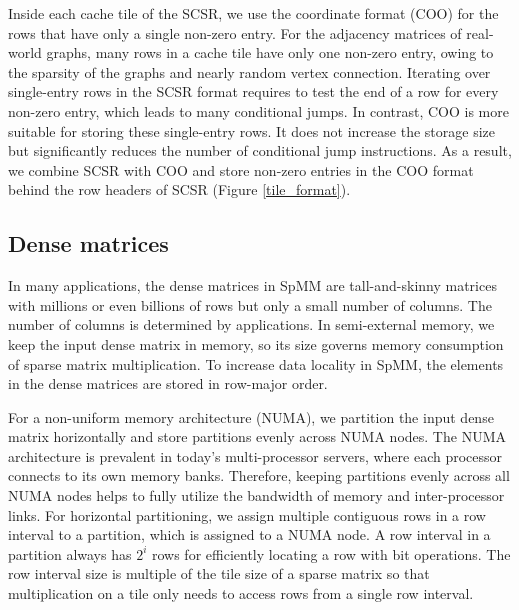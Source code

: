 Inside each cache tile of the SCSR, we use the coordinate format (COO) for
the rows that have only a single non-zero entry. For the adjacency matrices of
real-world graphs, many rows in a cache tile have only one non-zero entry,
owing to the sparsity of the graphs and nearly random vertex connection.
Iterating over single-entry rows in the SCSR format requires to test
the end of a row for every non-zero entry, which leads to many conditional jumps.
In contrast, COO is more suitable for storing these
single-entry rows. It does not increase the storage size but significantly
reduces the number of conditional jump instructions. As a result, we combine
SCSR with COO and store non-zero entries in the COO format behind the row headers
of SCSR (Figure \ref{tile_format}).


\subsection{Dense matrices}
In many applications, the dense matrices in SpMM are
tall-and-skinny matrices with millions or even billions of rows but only a small
number of columns. The number of columns is determined by applications.
In semi-external memory,
we keep the input dense matrix in memory, so its size governs memory consumption
of sparse matrix multiplication. To increase data locality in SpMM, the elements
in the dense matrices are stored in row-major order.

For a non-uniform memory architecture (NUMA), we partition the input dense matrix
horizontally and store partitions evenly across NUMA nodes. The NUMA architecture
is prevalent in today's multi-processor servers, where each processor connects
to its own memory banks. Therefore, keeping partitions evenly across all NUMA
nodes helps to fully utilize the bandwidth of memory and inter-processor links.
For horizontal partitioning, we assign multiple contiguous rows in a row
interval to a partition, which is assigned to a NUMA node. A row interval
in a partition always has $2^i$ rows for efficiently locating a row
with bit operations. The row interval size is multiple of the tile size of
a sparse matrix so that multiplication on a tile only needs to access rows
from a single row interval.

